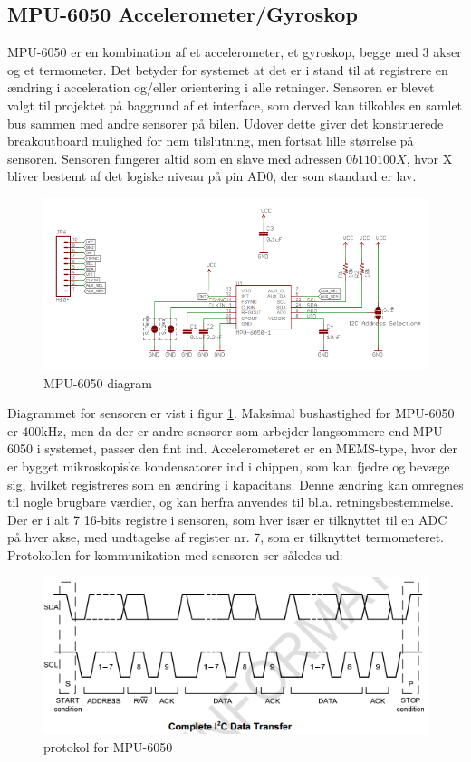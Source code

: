 \subsection{MPU-6050 Accelerometer/Gyroskop}

MPU-6050 er en kombination af et accelerometer, et gyroskop, begge med 3 akser og et termometer. Det betyder for systemet at det er i stand til at registrere en ændring i acceleration og/eller orientering i alle retninger. Sensoren er blevet valgt til projektet på baggrund af et \IIC interface, som derved kan tilkobles en samlet bus sammen med andre sensorer på bilen. Udover dette giver det konstruerede breakoutboard mulighed for nem tilslutning, men fortsat lille størrelse på sensoren.
Sensoren fungerer altid som en slave med adressen $0b110100X$, hvor X bliver bestemt af det logiske niveau på pin AD0, der som standard er lav. 

\begin{figure}[h]
	\centering
	\includegraphics[width=\textwidth*4/5]{../fig/billeder/mpu6050.png}
	\caption{MPU-6050 diagram}
	\label{fig:mpu6050}
\end{figure}

Diagrammet for sensoren er vist i figur \ref{fig:mpu6050}. Maksimal bushastighed for MPU-6050 er 400kHz, men da der er andre sensorer som arbejder langsommere end MPU-6050 i systemet, passer den fint ind. Accelerometeret er en MEMS-type, hvor der er bygget mikroskopiske kondensatorer ind i chippen, som kan fjedre og bevæge sig, hvilket registreres som en ændring i kapacitans. Denne ændring kan omregnes til nogle brugbare værdier, og kan herfra anvendes til bl.a. retningsbestemmelse. Der er i alt 7 16-bits registre i sensoren, som hver især er tilknyttet til en ADC på hver akse, med undtagelse af register nr. 7, som er tilknyttet termometeret. 
Protokollen for kommunikation med sensoren ser således ud:

\begin{figure}[h]
	\centering
	\includegraphics[width=\textwidth*4/5]{../fig/billeder/mpu6050i2c.png}
	\caption{\IIC protokol for MPU-6050}
	\label{fig:mpu6050i2c}
\end{figure}

